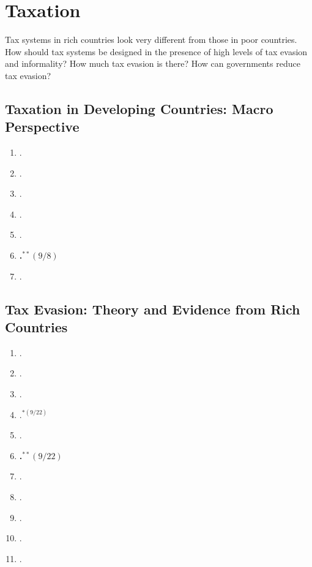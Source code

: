 \documentclass[11pt]{article}
\begin{document}
\section{Taxation}
Tax systems in rich countries look very different from those in poor countries. How should tax systems be designed in the presence of high levels of tax evasion and informality? How much tax evasion is there? How can governments reduce tax evasion?

\subsection{Taxation in Developing Countries: Macro Perspective}

\begin{enumerate}
\item {}.
\item {}.
\item {}.
\item {}.
\item {}.
\item \textbf{.$^{**}(9/8)$}
\item {}.
\end{enumerate}

\subsection{Tax Evasion: Theory and Evidence from Rich Countries}

\begin{enumerate}
\item {}.
\item {}.
\item {}.
\item {}.$^{*(9/22)}$
\item {}.
\item \textbf{.$^{**}(9/22)$}
\item {}.
\item {}.
\item {}.
\item {}.
\item {}.
\end{enumerate}
\end{document}

